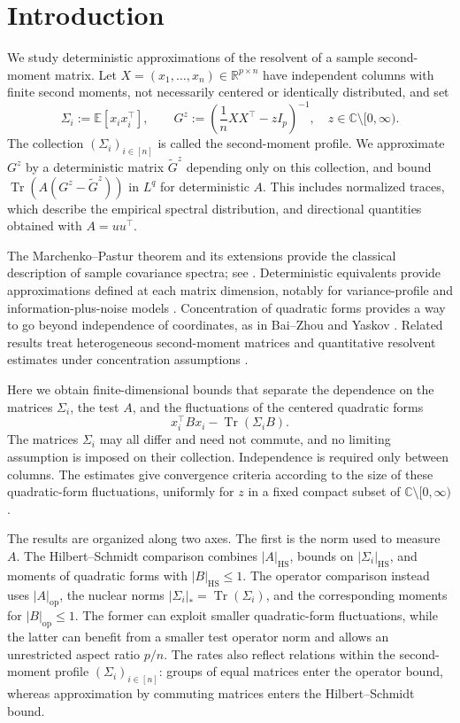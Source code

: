 \documentclass[EJP, preprint, NODS, nobera, nofontexpansion]{ejpecp}
\DeclareMathOperator{\op}{op}
\DeclareMathOperator{\tr}{Tr}
\DeclareMathOperator{\hs}{HS}
\begin{document}
\section*{Introduction}

We study deterministic approximations of the resolvent of a sample
second-moment matrix. Let $X=(x_1,\ldots,x_n)\in\mathbb R^{p\times n}$
have independent columns with finite second moments, not necessarily
centered or identically distributed, and set
\[
    \Sigma_i:=\mathbb E[x_ix_i^\top],
    \qquad
    G^z:=\left(\frac1nXX^\top-zI_p\right)^{-1},
    \quad z\in\mathbb C\setminus[0,\infty).
\]
The collection $(\Sigma_i)_{i\in[n]}$ is called the second-moment profile.
We approximate $G^z$ by a deterministic matrix $\tilde G^z$ depending only
on this collection, and bound $\tr(A(G^z-\tilde G^z))$ in $L^q$ for
deterministic $A$. This includes normalized traces, which describe the
empirical spectral distribution, and directional quantities obtained
with $A=uu^\top$.

The Marchenko--Pastur theorem \cite{MarchenkoPastur1967} and its extensions
provide the classical description of sample covariance spectra; see
\cite{BaiSilverstein2010,PasturShcherbina2011}.
Deterministic equivalents provide approximations defined at each matrix
dimension, notably for variance-profile and information-plus-noise models
\cite{DozierSilverstein2007,HachemLoubatonNajim2007}.
Concentration of quadratic forms provides a way to go beyond independence
of coordinates, as in Bai--Zhou \cite{BaiZhou2008} and Yaskov
\cite{Yaskov2016ECP}. Related results treat heterogeneous second-moment
matrices \cite{BenaychGeorgesCouillet2016,MeiWangYao2023} and quantitative
resolvent estimates under concentration assumptions
\cite{Chouard2022,FanMaPaquetteWang2026}.

Here we obtain finite-dimensional bounds that separate the dependence on
the matrices $\Sigma_i$, the test $A$, and the fluctuations of the centered
quadratic forms
\[
    x_i^\top Bx_i-\tr(\Sigma_iB).
\]
The matrices $\Sigma_i$ may all differ and need not commute, and no limiting
assumption is imposed on their collection. Independence is required only
between columns. The estimates give convergence criteria according to the
size of these quadratic-form fluctuations, uniformly for $z$ in a fixed
compact subset of $\mathbb C\setminus[0,\infty)$.

The results are organized along two axes. The first is the norm used to
measure $A$. The Hilbert--Schmidt comparison combines $|A|_{\hs}$, bounds
on $|\Sigma_i|_{\hs}$, and moments of quadratic forms with
$|B|_{\hs}\leq1$. The operator comparison instead uses $|A|_{\op}$,
the nuclear norms $|\Sigma_i|_*=\tr(\Sigma_i)$, and the corresponding
moments for $|B|_{\op}\leq1$. The former can exploit smaller quadratic-form
fluctuations, while the latter can benefit from a smaller test operator norm and
allows an unrestricted aspect ratio $p/n$. The rates also reflect
relations within the second-moment profile $(\Sigma_i)_{i\in[n]}$: groups of equal
matrices enter the operator bound, whereas approximation by commuting
matrices enters the Hilbert--Schmidt bound.
\end{document}
